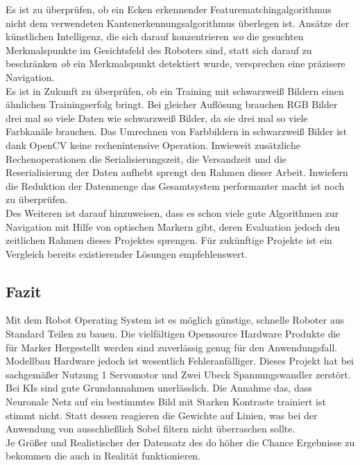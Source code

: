 \documentclass[conference]{IEEEtran}
\begin{document}
	Es ist zu überprüfen, ob ein Ecken erkennender Featurematchingalgorithmus nicht dem verwendeten Kantenerkennungsalgorithmus überlegen ist. Ansätze der künstlichen Intelligenz, die sich darauf konzentrieren \textit{wo} die gesuchten Merkmalspunkte im Gesichtsfeld des Roboters sind, statt sich darauf zu beschränken \textit{ob} ein Merkmalspunkt detektiert wurde, versprechen eine präzisere Navigation. \\
	Es ist in Zukunft zu überprüfen, ob ein Training mit schwarzweiß Bildern einen ähnlichen Trainingserfolg bringt. Bei gleicher Auflösung brauchen RGB Bilder drei mal so viele Daten wie schwarzweiß Bilder, da sie drei mal so viele Farbkanäle brauchen. Das Umrechnen von Farbbildern in schwarzweiß Bilder ist dank OpenCV keine rechenintensive Operation. Inwieweit zusätzliche Rechenoperationen die Serialisierungszeit, die Versandzeit und die Reserialisierung der Daten aufhebt sprengt den Rahmen dieser Arbeit. Inwiefern die Reduktion der Datenmenge das Gesamtsystem performanter macht ist noch zu überprüfen.
	\\
	Des Weiteren ist darauf hinzuweisen, dass es schon viele gute Algorithmen zur Navigation mit Hilfe von optischen Markern gibt, deren Evaluation jedoch den zeitlichen Rahmen dieses Projektes sprengen. Für zukünftige Projekte ist ein Vergleich bereits existierender Lösungen empfehlenswert.
		
	\subsection{Fazit}

Mit dem Robot Operating System ist es möglich günstige, schnelle Roboter 
aus Standard Teilen zu bauen. Die vielfältigen Opensource Hardware 
Produkte die für Marker Hergestellt werden sind zuverlässig genug für den 
Anwendungsfall. Modellbau Hardware jedoch ist wesentlich Fehleranfälliger. 
Dieses Projekt hat bei sachgemäßer Nutzung 1 Servomotor und Zwei Ubeck 
Spannungswandler zerstört.\\

Bei KIs sind gute Grundannahmen unerlässlich. Die Annahme das, dass 
Neuronale Netz auf ein bestimmtes Bild mit  Starken Kontraste trainiert ist 
stimmt nicht. Statt dessen reagieren die Gewichte auf Linien, was bei der 
Anwendung von ausschließlich Sobel filtern nicht überraschen sollte.
\\
Je Größer und Realistischer der Datensatz des do höher die Chance 
Ergebnisse zu bekommen die auch in Realität funktionieren.   \\
\end{document}
